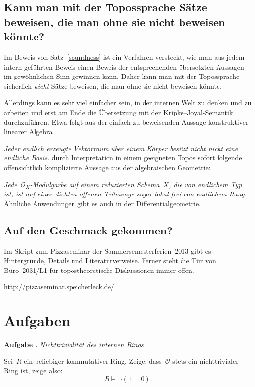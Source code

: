 \documentclass[a4paper,ngerman,12pt]{scrartcl}
\theoremstyle{definition}
\theoremstyle{plain}
\theoremstyle{remark}
\renewcommand{\O}{\mathcal{O}}
\renewcommand{\_}{\mathpunct{.}\,}
\newcommand{\?}{\,{:}\,}
\newlength{\aufgabenskip}
\newcounter{aufgabennummer}
\newenvironment{aufgabe}[1]{
  \addtocounter{aufgabennummer}{1}
  \textbf{Aufgabe \theaufgabennummer{}.} \emph{#1} \par
}{\vspace{\aufgabenskip}}
\newenvironment{indentblock}{%
  \list{}{\leftmargin\leftmargin}%
  \item\relax
}{%
  \endlist
}
\begin{document}
\subsection*{Kann man mit der Topossprache Sätze beweisen, die man ohne sie
nicht beweisen könnte?}

Im Beweis von Satz~\ref{soundness} ist ein Verfahren versteckt, wie man aus
jedem intern geführten Beweis einen Beweis der entsprechenden übersetzten
Aussagen im gewöhnlichen Sinn gewinnen kann. Daher kann man mit der
Topossprache sicherlich \emph{nicht} Sätze beweisen, die man ohne sie nicht
beweisen könnte.

Allerdings kann es sehr viel einfacher sein, in der internen Welt zu denken und
zu arbeiten
und erst am Ende die Übersetzung mit der Kripke--Joyal-Semantik durchzuführen.
Etwa folgt aus der einfach zu beweisenden Aussage konstruktiver linearer
Algebra
\begin{indentblock}
\emph{Jeder endlich erzeugte Vektorraum über einem Körper besitzt \emph{nicht nicht}
eine endliche Basis.}
\end{indentblock}
durch Interpretation in einem geeigneten Topos sofort folgende offensichtlich
komplizierte Aussage aus der algebraischen Geometrie:
\begin{indentblock}
\emph{Jede~$\O_X$-Modulgarbe auf einem reduzierten Schema~$X$, die von
endlichem Typ ist, ist auf einer dichten offenen Teilmenge sogar lokal frei von
endlichem Rang.}
\end{indentblock}
Ähnliche Anwendungen gibt es auch in der Differentialgeometrie.


\subsection*{Auf den Geschmack gekommen?}

Im Skript zum Pizzaseminar der Sommersemesterferien~2013 gibt es Hintergründe,
Details und Literaturverweise. Ferner steht die Tür von Büro~2031/L1 für
topostheoretische Diskussionen immer offen.
\begin{center}
\url{http://pizzaseminar.speicherleck.de/}
\end{center}


\newpage
\appendix
\section{Aufgaben}

\begin{aufgabe}{Nichttrivialität des internen Rings}
Sei~$R$ ein beliebiger kommutativer Ring. Zeige, dass~$\O$ stets ein
nichttrivialer Ring ist, zeige also:
\[ R \models \neg(1 = 0). \]
\end{aufgabe}
\vspace{-1.5em}
\end{document}
